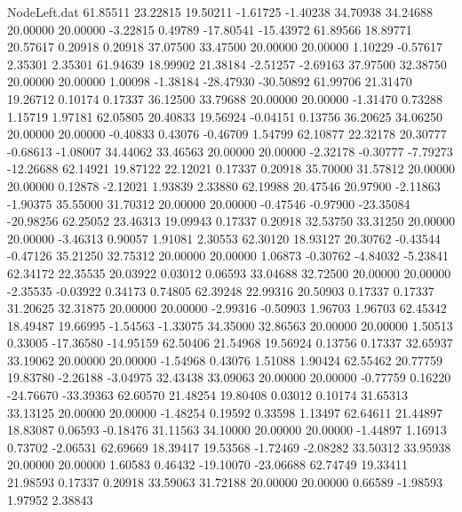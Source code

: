 \begin{filecontents}{NodeLeft.dat}
  61.85511   23.22815   19.50211    -1.61725   -1.40238   34.70938   34.24688   20.00000   20.00000   -3.22815    0.49789  -17.80541  -15.43972
  61.89566   18.89771   20.57617     0.20918    0.20918   37.07500   33.47500   20.00000   20.00000    1.10229   -0.57617    2.35301    2.35301
  61.94639   18.99902   21.38184    -2.51257   -2.69163   37.97500   32.38750   20.00000   20.00000    1.00098   -1.38184  -28.47930  -30.50892
  61.99706   21.31470   19.26712     0.10174    0.17337   36.12500   33.79688   20.00000   20.00000   -1.31470    0.73288    1.15719    1.97181
  62.05805   20.40833   19.56924    -0.04151    0.13756   36.20625   34.06250   20.00000   20.00000   -0.40833    0.43076   -0.46709    1.54799
  62.10877   22.32178   20.30777    -0.68613   -1.08007   34.44062   33.46563   20.00000   20.00000   -2.32178   -0.30777   -7.79273  -12.26688
  62.14921   19.87122   22.12021     0.17337    0.20918   35.70000   31.57812   20.00000   20.00000    0.12878   -2.12021    1.93839    2.33880
  62.19988   20.47546   20.97900    -2.11863   -1.90375   35.55000   31.70312   20.00000   20.00000   -0.47546   -0.97900  -23.35084  -20.98256
  62.25052   23.46313   19.09943     0.17337    0.20918   32.53750   33.31250   20.00000   20.00000   -3.46313    0.90057    1.91081    2.30553
  62.30120   18.93127   20.30762    -0.43544   -0.47126   35.21250   32.75312   20.00000   20.00000    1.06873   -0.30762   -4.84032   -5.23841
  62.34172   22.35535   20.03922     0.03012    0.06593   33.04688   32.72500   20.00000   20.00000   -2.35535   -0.03922    0.34173    0.74805
  62.39248   22.99316   20.50903     0.17337    0.17337   31.20625   32.31875   20.00000   20.00000   -2.99316   -0.50903    1.96703    1.96703
  62.45342   18.49487   19.66995    -1.54563   -1.33075   34.35000   32.86563   20.00000   20.00000    1.50513    0.33005  -17.36580  -14.95159
  62.50406   21.54968   19.56924     0.13756    0.17337   32.65937   33.19062   20.00000   20.00000   -1.54968    0.43076    1.51088    1.90424
  62.55462   20.77759   19.83780    -2.26188   -3.04975   32.43438   33.09063   20.00000   20.00000   -0.77759    0.16220  -24.76670  -33.39363
  62.60570   21.48254   19.80408     0.03012    0.10174   31.65313   33.13125   20.00000   20.00000   -1.48254    0.19592    0.33598    1.13497
  62.64611   21.44897   18.83087     0.06593   -0.18476   31.11563   34.10000   20.00000   20.00000   -1.44897    1.16913    0.73702   -2.06531
  62.69669   18.39417   19.53568    -1.72469   -2.08282   33.50312   33.95938   20.00000   20.00000    1.60583    0.46432  -19.10070  -23.06688
  62.74749   19.33411   21.98593     0.17337    0.20918   33.59063   31.72188   20.00000   20.00000    0.66589   -1.98593    1.97952    2.38843

\end{filecontents}
